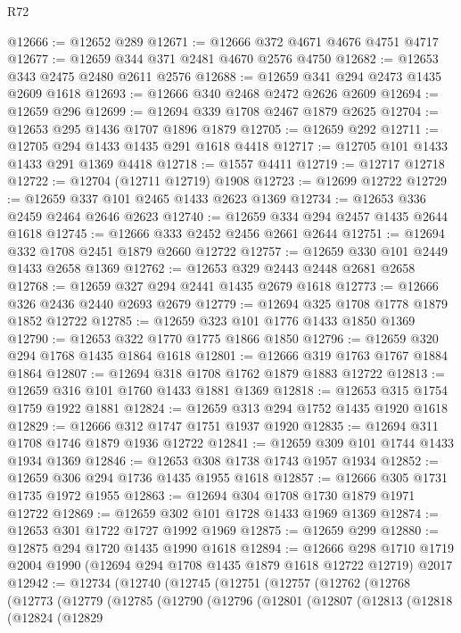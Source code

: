 \begin{lexlean}{R72}
\begin{coremodule}
@12666 := @12652 @289
@12671 := @12666 @372 @4671 @4676 @4751 @4717
@12677 := @12659 @344 @371 @2481 @4670 @2576 @4750
@12682 := @12653 @343 @2475 @2480 @2611 @2576
@12688 := @12659 @341 @294 @2473 @1435 @2609 @1618
@12693 := @12666 @340 @2468 @2472 @2626 @2609
@12694 := @12659 @296
@12699 := @12694 @339 @1708 @2467 @1879 @2625
@12704 := @12653 @295 @1436 @1707 @1896 @1879
@12705 := @12659 @292
@12711 := @12705 @294 @1433 @1435 @291 @1618 @4418
@12717 := @12705 @101 @1433 @1433 @291 @1369 @4418
@12718 := @1557 @4411
@12719 := @12717 @12718
@12722 := @12704 (@12711 @12719) @1908
@12723 := @12699 @12722
@12729 := @12659 @337 @101 @2465 @1433 @2623 @1369
@12734 := @12653 @336 @2459 @2464 @2646 @2623
@12740 := @12659 @334 @294 @2457 @1435 @2644 @1618
@12745 := @12666 @333 @2452 @2456 @2661 @2644
@12751 := @12694 @332 @1708 @2451 @1879 @2660 @12722
@12757 := @12659 @330 @101 @2449 @1433 @2658 @1369
@12762 := @12653 @329 @2443 @2448 @2681 @2658
@12768 := @12659 @327 @294 @2441 @1435 @2679 @1618
@12773 := @12666 @326 @2436 @2440 @2693 @2679
@12779 := @12694 @325 @1708 @1778 @1879 @1852 @12722
@12785 := @12659 @323 @101 @1776 @1433 @1850 @1369
@12790 := @12653 @322 @1770 @1775 @1866 @1850
@12796 := @12659 @320 @294 @1768 @1435 @1864 @1618
@12801 := @12666 @319 @1763 @1767 @1884 @1864
@12807 := @12694 @318 @1708 @1762 @1879 @1883 @12722
@12813 := @12659 @316 @101 @1760 @1433 @1881 @1369
@12818 := @12653 @315 @1754 @1759 @1922 @1881
@12824 := @12659 @313 @294 @1752 @1435 @1920 @1618
@12829 := @12666 @312 @1747 @1751 @1937 @1920
@12835 := @12694 @311 @1708 @1746 @1879 @1936 @12722
@12841 := @12659 @309 @101 @1744 @1433 @1934 @1369
@12846 := @12653 @308 @1738 @1743 @1957 @1934
@12852 := @12659 @306 @294 @1736 @1435 @1955 @1618
@12857 := @12666 @305 @1731 @1735 @1972 @1955
@12863 := @12694 @304 @1708 @1730 @1879 @1971 @12722
@12869 := @12659 @302 @101 @1728 @1433 @1969 @1369
@12874 := @12653 @301 @1722 @1727 @1992 @1969
@12875 := @12659 @299
@12880 := @12875 @294 @1720 @1435 @1990 @1618
@12894 := @12666
    @298
    @1710
    @1719
    @2004
    @1990
    (@12694 @294 @1708 @1435 @1879 @1618 @12722 @12719)
    @2017
@12942 := @12734
    (@12740
      (@12745
        (@12751
          (@12757
            (@12762
              (@12768
                (@12773
                  (@12779
                    (@12785
                      (@12790
                        (@12796
                          (@12801
                            (@12807
                              (@12813
                                (@12818
                                  (@12824
                                    (@12829

\end{coremodule}
\end{lexlean}
